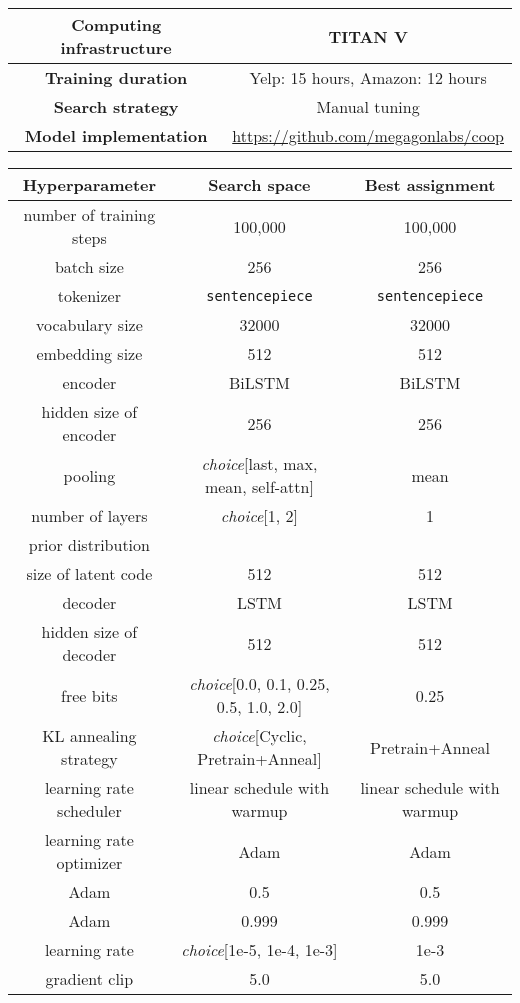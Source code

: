 \documentclass[11pt]{article}
\newcommand{\name}{\mbox{\sc BiMeanVAE}}
\newcommand{\yelp}{\mbox{\bf Yelp}}
\newcommand{\amazon}{\mbox{\bf Amazon}}
\begin{document}
\begin{table*}[ht]
    \centering
    \small
    \begin{tabular}{cc}
        \toprule
       \textbf{Computing infrastructure} & TITAN V\\
       \midrule
       \textbf{Training duration} & Yelp: 15 hours, Amazon: 12 hours\\
       \midrule
       \textbf{Search strategy} & Manual tuning \\\midrule
       \textbf{Model implementation} & \url{https://github.com/megagonlabs/coop}\\
       \bottomrule
    \end{tabular}

    \vspace{3mm}\begin{tabular}{ccc}
    \toprule
    \textbf{Hyperparameter} & \textbf{Search space} & \textbf{Best assignment} \\
    \midrule
    number of training steps & 100,000 & 100,000\\
    \midrule
    batch size & 256 & 256\\
    \midrule
    tokenizer & \texttt{sentencepiece} & \texttt{sentencepiece} \\
    \midrule
    vocabulary size & 32000 & 32000\\
    \midrule
    embedding size & 512 & 512\\
    \midrule
    encoder & BiLSTM & BiLSTM \\
    \midrule
    hidden size of encoder & 256 & 256 \\
    \midrule
    pooling & \emph{choice}[last, max, mean, self-attn] & mean\\
    \midrule
    number of layers & \emph{choice}[1, 2] & 1 \\
    \midrule
    prior distribution &  &  \\
    \midrule
    size of latent code & 512 & 512 \\
    \midrule
    decoder & LSTM & LSTM\\
    \midrule
    hidden size of decoder & 512 & 512 \\
    \midrule
    free bits & \emph{choice}[0.0, 0.1, 0.25, 0.5, 1.0, 2.0] & 0.25\\
    \midrule
    KL annealing strategy & \emph{choice}[Cyclic, Pretrain+Anneal] & Pretrain+Anneal\\
    \midrule
    learning rate scheduler & linear schedule with warmup & linear schedule with warmup\\
    \midrule
    learning rate optimizer & Adam & Adam\\
    \midrule
    Adam  & 0.5 & 0.5\\
    \midrule
    Adam  & 0.999 & 0.999\\
    \midrule
    learning rate & \emph{choice}[1e-5, 1e-4, 1e-3] & 1e-3 \\
    \midrule
    gradient clip & 5.0 & 5.0 \\
    \bottomrule
    \end{tabular}
    \caption{\name{} search space and the best assignments on \yelp{} and \amazon{} datasets.}
    \label{tab:bimeanvae_param}
\end{table*}
\end{document}
